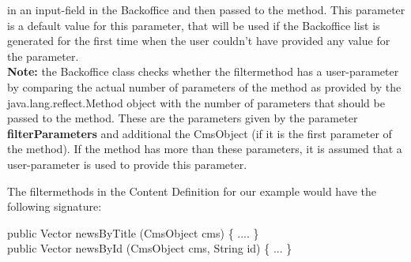 \begin{description}
in an input-field in the Backoffice and then passed to the method. This parameter is a default
value for this parameter, that will be used if the Backoffice list is generated for the first
time when the user couldn't have provided any value for the parameter.\\[1ex]
\textbf{Note:} the Backoffice class checks whether the filtermethod has a user-parameter by comparing
the actual number of parameters of the method as provided by the {\class java.lang.reflect.Method}
object with the number of parameters that should be passed to the method. These are the parameters
given by the parameter \textbf{filterParameters} and additional the {\class CmsObject} 
(if it is the first parameter of the method). If the method has more than these parameters, it is assumed
that a user-parameter is used to provide this parameter.
\end{description}

The filtermethods in the Content Definition for our example would have the following signature:
\begin{java}
\jtaba public Vector newsByTitle (CmsObject cms) \{ .... \}\\[1ex]
\jtaba public Vector newsById (CmsObject cms, String id) \{ ... \}\\
\end{java}






      


